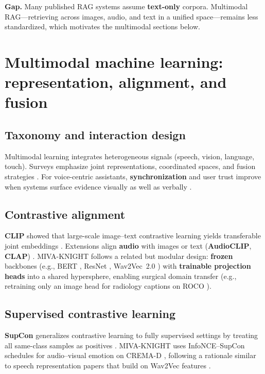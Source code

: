 \documentclass[12pt,a4paper]{article}
\begin{document}
\textbf{Gap.} Many published RAG systems assume \textbf{text-only} corpora. Multimodal RAG---retrieving across images, audio, and text in a unified space---remains less standardized, which motivates the multimodal sections below.

\section{Multimodal machine learning: representation, alignment, and fusion}

\subsection{Taxonomy and interaction design}

Multimodal learning integrates heterogeneous signals (speech, vision, language, touch). Surveys emphasize joint representations, coordinated spaces, and fusion strategies \cite{kadam2022multimodal}. For voice-centric assistants, \textbf{synchronization} and user trust improve when systems surface evidence visually as well as verbally \cite{kadam2022multimodal}.

\subsection{Contrastive alignment}

\textbf{CLIP} showed that large-scale image--text contrastive learning yields transferable joint embeddings \cite{radford2021learning}. Extensions align \textbf{audio} with images or text (\textbf{AudioCLIP}, \textbf{CLAP}) \cite{guzhov2022audioclip,elizalde2023clap}. MIVA-KNIGHT follows a related but modular design: \textbf{frozen} backbones (e.g., BERT \cite{devlin2019bert}, ResNet \cite{he2016deep}, Wav2Vec~2.0 \cite{baevski2020wav2vec}) with \textbf{trainable projection heads} into a shared hypersphere, enabling surgical domain transfer (e.g., retraining only an image head for radiology captions on ROCO \cite{pelka2018radiology}).

\subsection{Supervised contrastive learning}

\textbf{SupCon} generalizes contrastive learning to fully supervised settings by treating all same-class samples as positives \cite{khosla2020supervised}. MIVA-KNIGHT uses InfoNCE--SupCon schedules for audio--visual emotion on CREMA-D \cite{cao2014crema}, following a rationale similar to speech representation papers that build on Wav2Vec features \cite{pepino2021emotion}.
\end{document}
